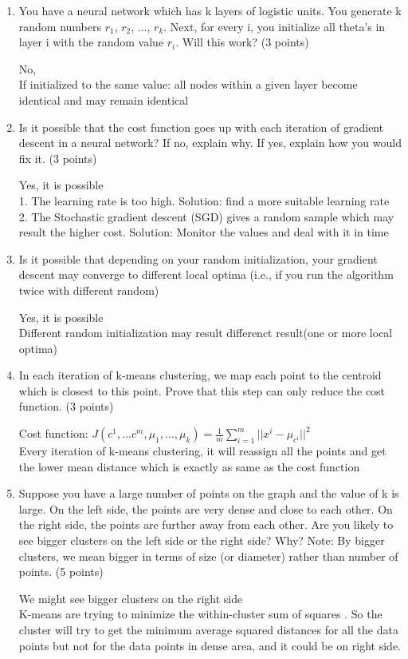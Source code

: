 \documentclass[a4paper]{article}
\begin{document}
\begin{enumerate}
    \item You have a neural network which has k layers of logistic units. You generate k random numbers
    $r_1$, $r_2$, ..., $r_k$. Next, for every i, you initialize all theta's in layer i with the random value $r_i$. Will
    this work? (3 points)

    {\normalfont No, \\
    If initialized to the same value: all nodes within a given 
layer become identical and may remain identical}

    \item Is it possible that the cost function goes up with each iteration of gradient descent in a neural
    network? If no, explain why. If yes, explain how you would fix it. (3 points)

    {\normalfont Yes, it is possible\\
    1. The learning rate is too high. Solution: find a more suitable learning rate\\
    2. The Stochastic gradient descent (SGD) gives a random sample which may result the higher cost. Solution: Monitor the values and deal with it in time}

    \item Is it possible that depending on your random initialization, your gradient descent may converge
    to different local optima (i.e., if you run the algorithm twice with different random)

    {\normalfont Yes, it is possible\\
    Different random initialization may result differenct result(one or more local optima)}

    \item In each iteration of k-means clustering, we map each point to the centroid which is closest to
    this point. Prove that this step can only reduce the cost function. (3 points)
    
    {\normalfont Cost function: $J(c^1, ... c^m, \mu_1, ... ,\mu_k) = \frac{1}{m}\sum\limits^m_{i=1}||x^i-\mu_{c^i}||^2$\\
    Every iteration of k-means clustering, it will reassign all the points and get the lower mean distance which is exactly as same as the cost function}

    \item Suppose you have a large number of points on the graph and the value of k is large. On the left
    side, the points are very dense and close to each other. On the right side, the points are further
    away from each other. Are you likely to see bigger clusters on the left side or the right side? Why?
    Note: By bigger clusters, we mean bigger in terms of size (or diameter) rather than number of
    points. (5 points)

    {\normalfont We might see bigger clusters on the right side\\
    K-means are trying to minimize the within-cluster sum of squares . So the cluster will try to get the minimum average squared distances for all the data points but not for the data points in dense area, and it could be on right side.}

\end{enumerate}
\end{document}
